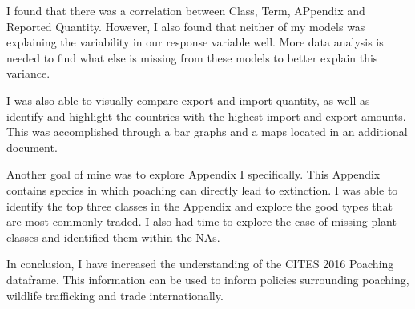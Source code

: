 \documentclass[
  12pt,
]{article}
\begin{document}
I found that there was a correlation between Class, Term, APpendix and
Reported Quantity. However, I also found that neither of my models was
explaining the variability in our response variable well. More data
analysis is needed to find what else is missing from these models to
better explain this variance.

I was also able to visually compare export and import quantity, as well
as identify and highlight the countries with the highest import and
export amounts. This was accomplished through a bar graphs and a maps
located in an additional document.

Another goal of mine was to explore Appendix I specifically. This
Appendix contains species in which poaching can directly lead to
extinction. I was able to identify the top three classes in the Appendix
and explore the good types that are most commonly traded. I also had
time to explore the case of missing plant classes and identified them
within the NAs.

In conclusion, I have increased the understanding of the CITES 2016
Poaching dataframe. This information can be used to inform policies
surrounding poaching, wildlife trafficking and trade internationally.
\end{document}
